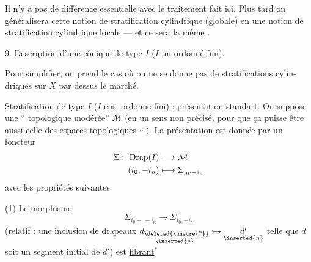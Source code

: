 
Il n'y a pas de différence essentielle avec
le traitement fait ici. Plus tard on
généralisera cette notion de stratification
cylindrique (globale) en une notion de
stratification cylindrique locale --- et ce sera
la même .

9. \uline{Description d'une} 
 \uline{cônique} \uline{de type} \(I\)
(\(I\) un ordonné fini).

Pour simplifier, on prend  le cas où on
ne se donne pas de stratifications cylin-\\
driques sur \(X\) par dessus le marché.




Stratification 
de type \(I\) (\(I\) ens. ordonne fini) : présentation standart.
On suppose  une `` topologique modérée'' \(\mathcal M\)
(en un sens non précisé, pour que ça puisse être aussi celle des
espaces topologiques \(\cdots\)). La présentation est donnée
par un  foncteur
\[
 \begin{aligned}
 \Sigma:\ \operatorname{Drap}(I)&\longrightarrow\mathcal M\\
 (i_0,-i_n)&\longmapsto\Sigma_{i_0\mathinner{\cdotp-}i_n}
 \end{aligned}
\]
avec les propriétés suivantes

(1) Le  morphisme
\[
 \Sigma_{i_0-\, -i_n}\longrightarrow\Sigma_{i_0,-i_p}
\]
(relatif : une inclusion de drapeaux
\(\underset{\inserted{p}}{d_{\deleted{\unsure{?}}}}\hookrightarrow\underset{\inserted{n}}{d'}\) telle
que \(d\) soit un segment initial de \(d'\)) est \uline{fibrant}\(^*\)



